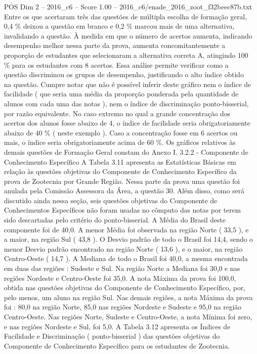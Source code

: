 \begin{textsample}{POS Dim 2 – 2016\_c6 – Score 1.00 – 2016\_c6/enade\_2016\_zoot\_f32beec87b.txt}
Entre os que acertaram três das questões de múltipla escolha de formação geral, 0,4 \% deixou a questão em branco e 0,2 \% marcou mais de uma alternativa, invalidando a questão.
À medida em que o número de acertos aumenta, indicando desempenho melhor nessa parte da prova, aumenta concomitantemente a proporção de estudantes que selecionaram a alternativa correta A, atingindo 100 \% para os estudantes com 8 acertos.
Essa análise permite verificar como a questão discriminou os grupos de desempenho, justificando o alto índice obtido na questão.
Cumpre notar que não é possível inferir deste gráfico nem o índice de facilidade ( que seria uma média da proporção ponderada pela quantidade de alunos com cada uma das notas ), nem o índice de discriminação ponto-bisserial, por razão equivalente.
No caso extremo no qual a grande concentração dos acertos dos alunos fosse abaixo de 4, o índice de facilidade seria obrigatoriamente abaixo de 40 \% ( neste exemplo ).
Caso a concentração fosse em 6 acertos ou mais, o índice seria obrigatoriamente acima de 60 \%.
Os gráficos relativos às demais questões de Formação Geral constam do Anexo I. 3.2.2 - Componente de Conhecimento Específico A Tabela 3.11 apresenta as Estatísticas Básicas em relação às questões objetivas do Componente de Conhecimento Específico da prova de Zootecnia por Grande Região.
Nessa parte da prova uma questão foi anulada pela Comissão Assessora da Área, a questão 30.
Além disso, como será discutido ainda nessa seção, seis questões objetivas do Componente de Conhecimentos Específicos não foram usadas no cômputo das notas por terem sido descartadas pelo critério do ponto-bisserial.
A Média do Brasil deste componente foi de 40,0.
A menor Média foi observada na região Norte ( 33,5 ), e a maior, na região Sul ( 43,8 ).
O Desvio padrão de todo o Brasil foi 14,4, sendo o menor Desvio padrão encontrado na região Norte ( 13,6 ), e o maior, na região Centro-Oeste ( 14,7 ).
A Mediana de todo o Brasil foi 40,0, a mesma encontrada em duas das regiões : Sudeste e Sul.
Na região Norte a Mediana foi 30,0 e nas regiões Nordeste e Centro-Oeste foi 35,0.
A nota Máxima da prova foi 100,0, obtida nas questões objetivas do Componente de Conhecimento Específico, por, pelo menos, um aluno na região Sul.
Nas demais regiões, a nota Máxima da prova foi : 80,0 na região Norte, 85,0 nas regiões Nordeste e Sudeste e 95,0 na região Centro-Oeste.
Nas regiões Norte, Sudeste e Centro-Oeste, a nota Mínima foi zero, e nas regiões Nordeste e Sul, foi 5,0.
A Tabela 3.12 apresenta os Índices de Facilidade e Discriminação ( ponto-bisserial ) das questões objetivas do Componente de Conhecimento Específico para os estudantes de Zootecnia.

\end{textsample}

